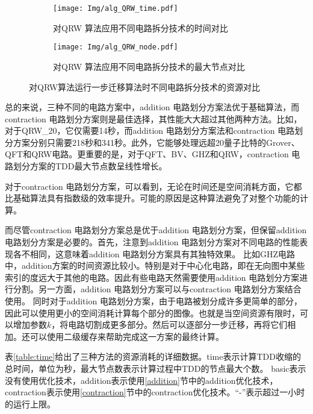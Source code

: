 \begin{figure}[!htbp]
    \centering
    \begin{subfigure}[b]{.45\textwidth}
        \centering
        \texttt{[image: Img/alg\_QRW\_time.pdf]}
        \caption{对QRW 算法应用不同电路拆分技术的时间对比}
        \label{fig:QRW-time}
    \end{subfigure}
    \qquad
    \begin{subfigure}[b]{.45\textwidth}
        \centering
        \texttt{[image: Img/alg\_QRW\_node.pdf]}
        \caption{对QRW 算法应用不同电路拆分技术的最大节点对比}
        \label{fig:QRW-node}
    \end{subfigure}
    \caption{对QRW算法运行一步迁移算法时不同电路拆分技术的资源对比}
    \label{fig:QRW-compare}
\end{figure}

总的来说，三种不同的电路方案中，addition 电路划分方案法优于基础算法，而contraction 电路划分方案则是最佳选择，其性能大大超过其他两种方法。比如，对于QRW\_20，它仅需要14秒，而addition 电路划分方案法和contraction 电路划分方案分别只需要218秒和341秒。此外，它能够处理远超20量子比特的Grover、QFT和QRW电路。更重要的是，对于QFT、BV、GHZ和QRW，contraction 电路划分方案的TDD最大节点数呈线性增长。

对于contraction 电路划分方案，可以看到，无论在时间还是空间消耗方面，它都比基础算法具有指数级的效率提升。可能的原因是这种算法避免了对整个功能的计算。

而尽管contraction 电路划分方案总是优于addition 电路划分方案，但保留addition 电路划分方案是必要的。首先，注意到addition 电路划分方案对不同电路的性能表现各不相同，这意味着addition 电路划分方案具有其独特效果。
比如GHZ电路中，addition方案的时间资源比较小。特别是对于中心化电路，即在无向图中某些索引的度远大于其他的电路。因此有些电路天然需要使用addition 电路划分方案进行分割。另一方面，addition 电路划分方案可以与contraction 电路划分方案结合使用。
同时对于addition 电路划分方案，由于电路被划分成许多更简单的部分，因此可以使用更小的空间消耗计算每个部分的图像。也就是当空间资源有限时，可以增加参数$k$，将电路切割成更多部分。然后可以逐部分一步迁移，再将它们相加。还可以使用二级缓存来帮助完成这一方案的最终计算。

表\ref{table:time}给出了三种方法的资源消耗的详细数据。time表示计算TDD收缩的总时间，单位为秒，最大节点数表示计算过程中TDD的节点最大个数。
basic表示没有使用优化技术，addition表示使用\ref{addition}节中的addition优化技术，contraction表示使用\ref{contraction}节中的contraction优化技术。“-”表示超过一小时的运行上限。

